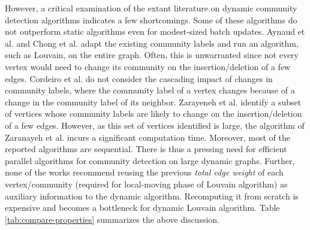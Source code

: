 However, a critical examination of the extant literature on dynamic community detection algorithms indicates a few shortcomings. Some of these algorithms \cite{com-cordeiro16, com-meng16} do not outperform static algorithms even for modest-sized batch updates. Aynaud et al. \cite{com-aynaud10} and Chong et al. \cite{com-chong13} adapt the existing community labels and run an algorithm, such as Louvain, on the entire graph. Often, this is unwarranted since not every vertex would need to change its community on the insertion/deletion of a few edges. Cordeiro et al. \cite{com-cordeiro16} do not consider the cascading impact of changes in community labels, where the community label of a vertex changes because of a change in the community label of its neighbor. Zarayeneh et al. \cite{com-zarayeneh21} identify a subset of vertices whose community labels are likely to change on the insertion/deletion of a few edges. However, as this set of vertices identified is large, the algorithm of Zaranayeh et al. incurs a significant computation time. Moreover, most of the reported algorithms \cite{com-aynaud10, com-chong13, com-meng16, com-cordeiro16, com-zhuang19, com-zarayeneh21} are sequential. There is thus a pressing need for efficient parallel algorithms for community detection on large dynamic graphs. Further, none of the works recommend reusing the previous \textit{total edge weight} of each vertex/community (required for local-moving phase of Louvain algorithm) as auxiliary information to the dynamic algorithm. Recomputing it from scratch is expensive and becomes a bottleneck for dynamic Louvain algorithm. Table \ref{tab:compare-properties} summarizes the above discussion.


